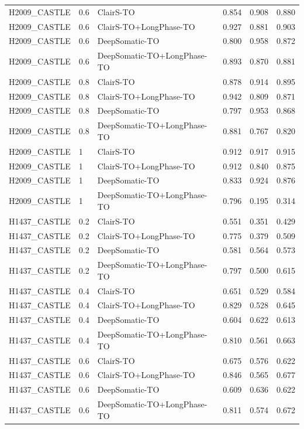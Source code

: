\documentclass[pdflatex,sn-nature]{sn-jnl}
\begin{document}
{\begin{longtable}{@{}lllccc@{}}
  H2009\_CASTLE & 0.6 & ClairS-TO & 0.854 & 0.908 & 0.880 \\
  H2009\_CASTLE & 0.6 & ClairS-TO+LongPhase-TO & 0.927 & 0.881 & 0.903 \\
  H2009\_CASTLE & 0.6 & DeepSomatic-TO & 0.800 & 0.958 & 0.872 \\
  H2009\_CASTLE & 0.6 & DeepSomatic-TO+LongPhase-TO & 0.893 & 0.870 & 0.881 \\
  H2009\_CASTLE & 0.8 & ClairS-TO & 0.878 & 0.914 & 0.895 \\
  H2009\_CASTLE & 0.8 & ClairS-TO+LongPhase-TO & 0.942 & 0.809 & 0.871 \\
  H2009\_CASTLE & 0.8 & DeepSomatic-TO & 0.797 & 0.953 & 0.868 \\
  H2009\_CASTLE & 0.8 & DeepSomatic-TO+LongPhase-TO & 0.881 & 0.767 & 0.820 \\
  H2009\_CASTLE & 1 & ClairS-TO & 0.912 & 0.917 & 0.915 \\
  H2009\_CASTLE & 1 & ClairS-TO+LongPhase-TO & 0.912 & 0.840 & 0.875 \\
  H2009\_CASTLE & 1 & DeepSomatic-TO & 0.833 & 0.924 & 0.876 \\
  H2009\_CASTLE & 1 & DeepSomatic-TO+LongPhase-TO & 0.796 & 0.195 & 0.314 \\
  \addlinespace
  H1437\_CASTLE & 0.2 & ClairS-TO & 0.551 & 0.351 & 0.429 \\
  H1437\_CASTLE & 0.2 & ClairS-TO+LongPhase-TO & 0.775 & 0.379 & 0.509 \\
  H1437\_CASTLE & 0.2 & DeepSomatic-TO & 0.581 & 0.564 & 0.573 \\
  H1437\_CASTLE & 0.2 & DeepSomatic-TO+LongPhase-TO & 0.797 & 0.500 & 0.615 \\
  H1437\_CASTLE & 0.4 & ClairS-TO & 0.651 & 0.529 & 0.584 \\
  H1437\_CASTLE & 0.4 & ClairS-TO+LongPhase-TO & 0.829 & 0.528 & 0.645 \\
  H1437\_CASTLE & 0.4 & DeepSomatic-TO & 0.604 & 0.622 & 0.613 \\
  H1437\_CASTLE & 0.4 & DeepSomatic-TO+LongPhase-TO & 0.810 & 0.561 & 0.663 \\
  H1437\_CASTLE & 0.6 & ClairS-TO & 0.675 & 0.576 & 0.622 \\
  H1437\_CASTLE & 0.6 & ClairS-TO+LongPhase-TO & 0.846 & 0.565 & 0.677 \\
  H1437\_CASTLE & 0.6 & DeepSomatic-TO & 0.609 & 0.636 & 0.622 \\
  H1437\_CASTLE & 0.6 & DeepSomatic-TO+LongPhase-TO & 0.811 & 0.574 & 0.672 \\

\end{longtable}}
\end{document}
